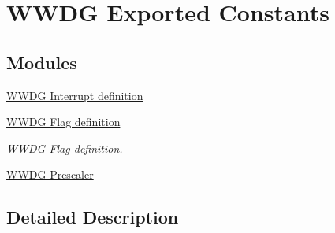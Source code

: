 \hypertarget{group___w_w_d_g___exported___constants}{}\section{W\+W\+DG Exported Constants}
\label{group___w_w_d_g___exported___constants}
\subsection*{Modules}
\begin{DoxyCompactItemize}
\item 
\hyperlink{group___w_w_d_g___interrupt__definition}{W\+W\+D\+G Interrupt definition}
\item 
\hyperlink{group___w_w_d_g___flag__definition}{W\+W\+D\+G Flag definition}
\begin{DoxyCompactList}\small\item\em W\+W\+DG Flag definition. \end{DoxyCompactList}\item 
\hyperlink{group___w_w_d_g___prescaler}{W\+W\+D\+G Prescaler}
\end{DoxyCompactItemize}


\subsection{Detailed Description}
